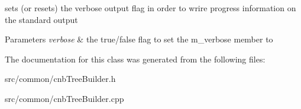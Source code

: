 sets (or resets) the verbose output flag in order to wrire progress information on the standard output 
\begin{DoxyParams}{\-Parameters}
{\em verbose} & the true/false flag to set the m\-\_\-verbose member to \\
\hline
\end{DoxyParams}


\-The documentation for this class was generated from the following files\-:\begin{DoxyCompactItemize}
\item 
src/common/cnb\-Tree\-Builder.\-h\item 
src/common/cnb\-Tree\-Builder.\-cpp\end{DoxyCompactItemize}
